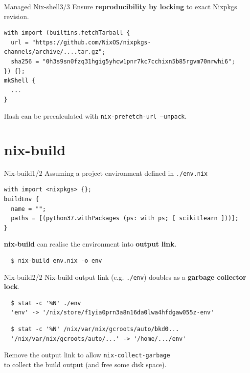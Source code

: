 \documentclass[12pt,aspectratio=169]{beamer}
\begin{document}
\begin{frame}[fragile]{Managed Nix-shell\hfill3/3}
  Ensure \textbf{reproducibility by locking} to exact Nixpkgs revision.
  \begin{verbatim}
with import (builtins.fetchTarball {
  url = "https://github.com/NixOS/nixpkgs-channels/archive/....tar.gz";
  sha256 = "0h3s9sn0fzq31hgig5yhcw1pnr7kc7cchixn5b85rgvm70nrwhi6";
}) {};
mkShell {
  ...
}
  \end{verbatim}
  Hash can be precalculated with \texttt{nix-prefetch-url --unpack}.
\end{frame}


\section{nix-build}


\begin{frame}[fragile]{Nix-build\hfill1/2}
  Assuming a project environment defined in \texttt{./env.nix}
  \begin{verbatim}
with import <nixpkgs> {};
buildEnv {
  name = "";
  paths = [(python37.withPackages (ps: with ps; [ scikitlearn ]))];
}
  \end{verbatim}
  \textbf{nix-build} can realise the environment into \textbf{output link}.
  \begin{verbatim}
  $ nix-build env.nix -o env
  \end{verbatim}
\end{frame}


\begin{frame}[fragile]{Nix-build\hfill2/2}
  Nix-build output link (e.g. \texttt{./env}) doubles as a \textbf{garbage collector lock}.
  \begin{verbatim}
  $ stat -c '%N' ./env
  'env' -> '/nix/store/f1yia0prn3a8n16da0lwa4hfdgaw055z-env'
  \end{verbatim}
  \begin{verbatim}
  $ stat -c '%N' /nix/var/nix/gcroots/auto/bkd0...
  '/nix/var/nix/gcroots/auto/...' -> '/home/.../env'
  \end{verbatim}
  Remove the output link to allow \texttt{nix-collect-garbage} \\
  to collect the build output (and free some disk space).
\end{frame}
\end{document}

